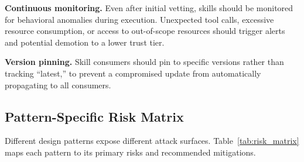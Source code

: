 \documentclass[conference, compsoc]{IEEEtran}
\theoremstyle{plain}
\newcommand{\para}[1]{\smallskip\noindent\textbf{#1.}}
\begin{document}
\para{Continuous monitoring} Even after initial vetting, skills should be monitored for behavioral anomalies during execution. Unexpected tool calls, excessive resource consumption, or access to out-of-scope resources should trigger alerts and potential demotion to a lower trust tier.

\para{Version pinning} Skill consumers should pin to specific versions rather than tracking ``latest,'' to prevent a compromised update from automatically propagating to all consumers.

\subsection{Pattern-Specific Risk Matrix}
\label{sec:security:riskmatrix}

Different design patterns expose different attack surfaces. Table~\ref{tab:risk_matrix} maps each pattern to its primary risks and recommended mitigations.
\end{document}
